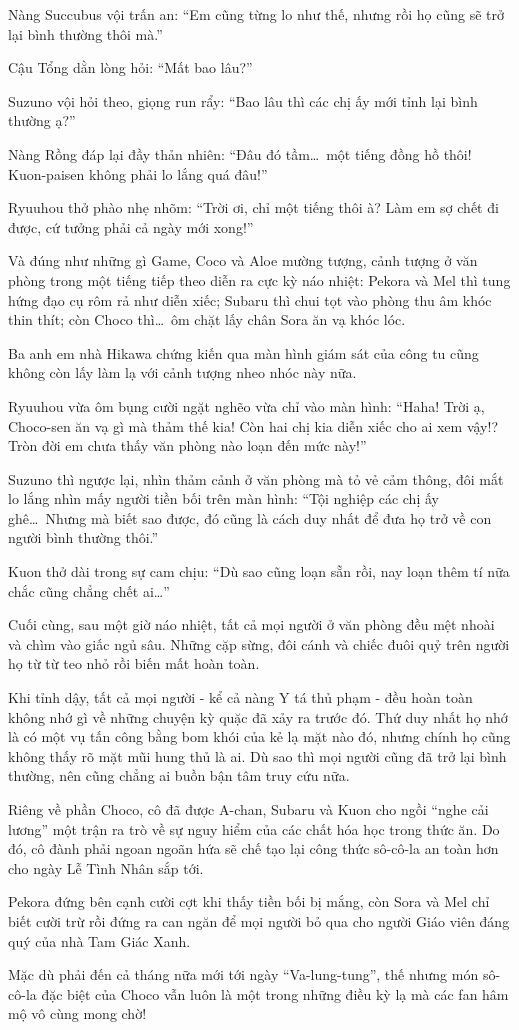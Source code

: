 \documentclass[../main.tex]{subfiles}
\begin{document}
Nàng Succubus vội trấn an: ``Em cũng từng lo như thế, nhưng rồi họ cũng sẽ trở lại bình thường thôi mà.''

Cậu Tổng dằn lòng hỏi: ``Mất bao lâu?''

Suzuno vội hỏi theo, giọng run rẩy: ``Bao lâu thì các chị ấy mới tỉnh lại bình thường ạ?''

Nàng Rồng đáp lại đầy thản nhiên: ``Đâu đó tầm\dots\ một tiếng đồng hồ thôi! Kuon-paisen không phải lo lắng quá đâu!''

Ryuuhou thở phào nhẹ nhõm: ``Trời ơi, chỉ một tiếng thôi à? Làm em sợ chết đi được, cứ tưởng phải cả ngày mới xong!''

Và đúng như những gì Game, Coco và Aloe mường tượng, cảnh tượng ở văn phòng trong một tiếng tiếp theo diễn ra cực kỳ náo nhiệt: Pekora và Mel thì tung hứng đạo cụ rôm rả như diễn xiếc; Subaru thì chui tọt vào phòng thu âm khóc thin thít; còn Choco thì\dots\ ôm chặt lấy chân Sora ăn vạ khóc lóc.

Ba anh em nhà Hikawa chứng kiến qua màn hình giám sát của công tu cũng không còn lấy làm lạ với cảnh tượng nheo nhóc này nữa.

Ryuuhou vừa ôm bụng cười ngặt nghẽo vừa chỉ vào màn hình: ``Haha! Trời ạ, Choco-sen ăn vạ gì mà thảm thế kia! Còn hai chị kia diễn xiếc cho ai xem vậy!? Tròn đời em chưa thấy văn phòng nào loạn đến mức này!''

Suzuno thì ngược lại, nhìn thảm cảnh ở văn phòng mà tỏ vẻ cảm thông, đôi mắt lo lắng nhìn mấy người tiền bối trên màn hình: ``Tội nghiệp các chị ấy ghê\dots\ Nhưng mà biết sao được, đó cũng là cách duy nhất để đưa họ trở về con người bình thường thôi.''

Kuon thở dài trong sự cam chịu: ``Dù sao \hll cũng loạn sẵn rồi, nay loạn thêm tí nữa chắc cũng chẳng chết ai\dots''

Cuối cùng, sau một giờ náo nhiệt, tất cả mọi người ở văn phòng đều mệt nhoài và chìm vào giấc ngủ sâu. Những cặp sừng, đôi cánh và chiếc đuôi quỷ trên người họ từ từ teo nhỏ rồi biến mất hoàn toàn.

Khi tỉnh dậy, tất cả mọi người - kể cả nàng Y tá thủ phạm - đều hoàn toàn không nhớ gì về những chuyện kỳ quặc đã xảy ra trước đó. Thứ duy nhất họ nhớ là có một vụ tấn công bằng bom khói của kẻ lạ mặt nào đó, nhưng chính họ cũng không thấy rõ mặt mũi hung thủ là ai. Dù sao thì mọi người cũng đã trở lại bình thường, nên cũng chẳng ai buồn bận tâm truy cứu nữa.

Riêng về phần Choco, cô đã được A-chan, Subaru và Kuon cho ngồi ``nghe cải lương'' một trận ra trò về sự nguy hiểm của các chất hóa học trong thức ăn. Do đó, cô đành phải ngoan ngoãn hứa sẽ chế tạo lại công thức sô-cô-la an toàn hơn cho ngày Lễ Tình Nhân sắp tới.

Pekora đứng bên cạnh cười cợt khi thấy tiền bối bị mắng, còn Sora và Mel chỉ biết cười trừ rồi đứng ra can ngăn để mọi người bỏ qua cho người Giáo viên đáng quý của nhà Tam Giác Xanh.

Mặc dù phải đến cả tháng nữa mới tới ngày ``Va-lung-tung'', thế nhưng món sô-cô-la đặc biệt của Choco vẫn luôn là một trong những điều kỳ lạ mà các fan hâm mộ vô cùng mong chờ!
\end{document}
